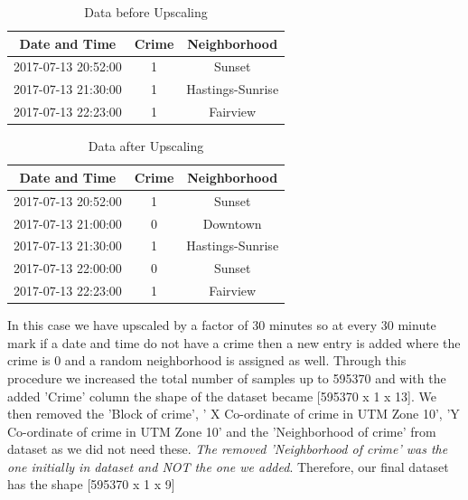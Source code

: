 \documentclass[conference]{IEEEtran}
\begin{document}
    \begin{table}[H]
        \renewcommand{\arraystretch}{1.3}
        \caption{Data before Upscaling}
        \label{table_example}
        \centering
        \begin{tabular}{|c|c|c|}
        \hline
        \bfseries Date and Time & \bfseries Crime & \bfseries Neighborhood\\
        \hline
        2017-07-13 20:52:00 & 1 & Sunset\\
        \hline
        2017-07-13 21:30:00 & 1 & Hastings-Sunrise\\
        \hline
        2017-07-13 22:23:00 & 1 & Fairview\\
        \hline
        \end{tabular}
    \end{table}

    \begin{table}[H]
        \renewcommand{\arraystretch}{1.3}
        \caption{Data after Upscaling}
        \label{table_example}
        \centering
        \begin{tabular}{|c|c|c|}
        \hline
        \bfseries Date and Time & \bfseries Crime & \bfseries Neighborhood\\
        \hline
        2017-07-13 20:52:00 & 1 & Sunset\\
        \hline
        2017-07-13 21:00:00 & 0 & Downtown\\
        \hline
        2017-07-13 21:30:00 & 1 & Hastings-Sunrise\\
        \hline
        2017-07-13 22:00:00 & 0 & Sunset\\
        \hline
        2017-07-13 22:23:00 & 1 & Fairview\\
        \hline
        \end{tabular}
    \end{table}

    In this case we have upscaled by a factor of 30 minutes so at every 30 minute mark if
    a date and time do not have a crime then a new entry is added where the crime is 0 and
    a random neighborhood is assigned as well. Through this procedure we increased the total
    number of samples up to 595370 and with the added 'Crime' column the shape of the dataset
    became [595370 x 1 x 13]. We then removed the 'Block of crime', ' X Co-ordinate of crime in UTM Zone 10',
    'Y Co-ordinate of crime in UTM Zone 10' and the 'Neighborhood of crime' from dataset as we did not need these.
    \emph{The removed 'Neighborhood of crime' was the one initially in dataset and NOT the one we added}. Therefore,
    our final dataset has the shape [595370 x 1 x 9]
\end{document}
